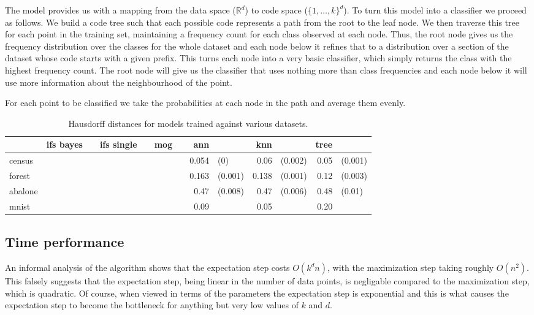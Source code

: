 \documentclass[10pt,a4paper,oneside]{article}
\theoremstyle{definition}
\begin{document}
The model provides us with a mapping from the data space (${\mathbb R}^d$) to code space ($\{1, \ldots, k\}^d$). To turn this model into a classifier we proceed as follows. We build a code tree such that each possible code represents a path from the root to the leaf node. We then traverse this tree for each point in the training set, maintaining a frequency count for each class observed at each node. Thus, the root node gives us the frequency distribution over the classes for the whole dataset and each node below it refines that to a distribution over a section of the dataset whose code starts with a given prefix. This turns each node into a very basic classifier, which simply returns the class with the highest frequency count. The root node will give us the classifier that uses nothing more than class frequencies and each node below it will use more information about the neighbourhood of the point.

For each point to be classified we take the probabilities at each node in the path and average them evenly. 

\begin{table}[h]
\begin{tabular}{| l | r l r l | r l r l  r l r l |}
\hline
  & ifs bayes & & ifs single & & mog & & ann & & knn & & tree & \\
\hline
census  & & & & & & & 0.054 &\color{gray}(0) & 0.06 & \color{gray} (0.002) & 0.05 & \color{gray} (0.001) \\
forest  & & & & & & & 0.163 &\color{gray}(0.001) & 0.138 &\color{gray}(0.001) & 0.12&\color{gray}(0.003) \\
abalone & & & & & & & 0.47 & \color{gray}(0.008) & 0.47 & \color{gray}(0.006) & 0.48 & \color{gray}(0.01) \\
mnist   & & & & & & & 0.09 & & 0.05 & & 0.20 & \\
\hline

\end{tabular}
\caption{Hausdorff distances for models trained against various datasets.}
\label{classification-results}
\end{table}
\subsection{Time performance}

An informal analysis of the algorithm shows that the expectation step costs $O(k^dn)$, with the maximization step taking roughly $O(n^2)$. This falsely suggests that the expectation step, being linear in the number of data points, is negligable compared to the maximization step, which is quadratic. Of course, when viewed in terms of the parameters the expectation step is exponential and this is what causes the expectation step to become the bottleneck for anything but very low values of $k$ and $d$. 
\end{document}
